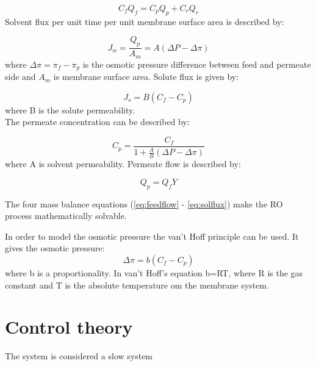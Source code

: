 \begin{equation}
\label{eq:mass}
C_{f}Q_{f}=C_{p}Q_{p}+C_{r}Q_{r}
\end{equation}
Solvent flux per unit time per unit membrane surface area is described by:

\begin{equation}
\label{eq:flux}
J_{w}=\frac{Q_{p}}{A_{m}}= A(\Delta P - \Delta \pi)
\end{equation}
where $\Delta\pi = \pi_{f} - \pi_{p}$ is the osmotic pressure difference between feed and permeate side and $A_{m}$ is membrane surface area.
Solute flux is given by:

\begin{equation}
\label{eq:solflux}
J_{s}=B(C_{f}- C_{p})
\end{equation}
 where B is the solute permeability.
\\The permeate concentration can be described by:

\begin{equation}
\label{eq:permcond}
C_{p}=\frac{C_{f}}{1+\frac{A}{B}(\Delta P - \Delta\pi)}
\end{equation}
where A is solvent permeability.
Permeate flow is described by:

\begin{equation}
\label{eq:permflow}
Q_{p}=Q_{f}Y
\end{equation}

The four mass balance equations (\ref{eq:feedflow} - \ref{eq:solflux}) make the RO process mathematically solvable.

In order to model the osmotic pressure the van't Hoff principle can be used. It gives the osmotic pressure:
\begin{equation}
\label{eq:posm}
\Delta\pi=b(C_{f}-C_{p})
\end{equation}
where b is a proportionality. In van't Hoff's equation b=RT, where R is the gas constant and T is the absolute temperature om the membrane system. 


\section{Control theory}


The system is considered a slow system




